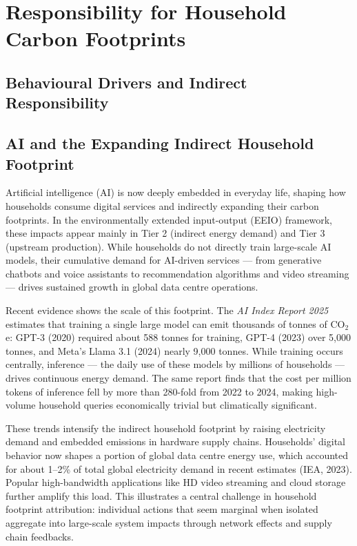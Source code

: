 \documentclass[12pt,a4paper]{article}%
\begin{document}
\section{Responsibility for Household Carbon Footprints}

\subsection{Behavioural Drivers and Indirect Responsibility}

\subsection{AI and the Expanding Indirect Household Footprint}

Artificial intelligence (AI) is now deeply embedded in everyday life, shaping how households consume digital services and indirectly expanding their carbon footprints. In the environmentally extended input-output (EEIO) framework, these impacts appear mainly in Tier 2 (indirect energy demand) and Tier 3 (upstream production). While households do not directly train large-scale AI models, their cumulative demand for AI-driven services --- from generative chatbots and voice assistants to recommendation algorithms and video streaming --- drives sustained growth in global data centre operations.

Recent evidence shows the scale of this footprint. The \textit{AI Index Report 2025} estimates that training a single large model can emit thousands of tonnes of CO$_2$e: GPT-3 (2020) required about 588 tonnes for training, GPT-4 (2023) over 5,000 tonnes, and Meta's Llama 3.1 (2024) nearly 9,000 tonnes. While training occurs centrally, inference --- the daily use of these models by millions of households --- drives continuous energy demand. The same report finds that the cost per million tokens of inference fell by more than 280-fold from 2022 to 2024, making high-volume household queries economically trivial but climatically significant.

These trends intensify the indirect household footprint by raising electricity demand and embedded emissions in hardware supply chains. Households' digital behavior now shapes a portion of global data centre energy use, which accounted for about 1--2\% of total global electricity demand in recent estimates (IEA, 2023). Popular high-bandwidth applications like HD video streaming and cloud storage further amplify this load. This illustrates a central challenge in household footprint attribution: individual actions that seem marginal when isolated aggregate into large-scale system impacts through network effects and supply chain feedbacks.
\end{document}
